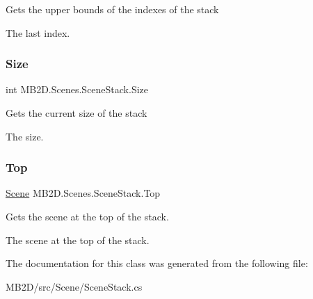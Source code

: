 Gets the upper bounds of the indexes of the stack 

The last index.\hypertarget{class_m_b2_d_1_1_scenes_1_1_scene_stack_a960aea6084b685c9cb4fce6b1a586009}{}\label{class_m_b2_d_1_1_scenes_1_1_scene_stack_a960aea6084b685c9cb4fce6b1a586009} 
\subsubsection{\texorpdfstring{Size}{Size}}
{\footnotesize\ttfamily int M\+B2\+D.\+Scenes.\+Scene\+Stack.\+Size\hspace{0.3cm}{\ttfamily [get]}}



Gets the current size of the stack 

The size.\hypertarget{class_m_b2_d_1_1_scenes_1_1_scene_stack_ad409d4fad58a067955ee1f6ed88229ef}{}\label{class_m_b2_d_1_1_scenes_1_1_scene_stack_ad409d4fad58a067955ee1f6ed88229ef} 
\subsubsection{\texorpdfstring{Top}{Top}}
{\footnotesize\ttfamily \hyperlink{class_m_b2_d_1_1_scenes_1_1_scene}{Scene} M\+B2\+D.\+Scenes.\+Scene\+Stack.\+Top\hspace{0.3cm}{\ttfamily [get]}}



Gets the scene at the top of the stack. 

The scene at the top of the stack.

The documentation for this class was generated from the following file\+:\begin{DoxyCompactItemize}
\item 
M\+B2\+D/src/\+Scene/Scene\+Stack.\+cs\end{DoxyCompactItemize}

